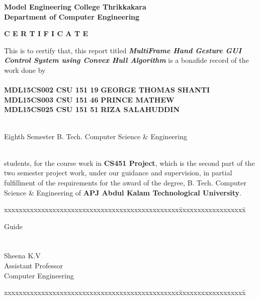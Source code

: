 \documentclass[11pt]{report}
\begin{document}
\begin{titlepage}
\begin{center}
\Large{\textbf{Model Engineering College Thrikkakara}}\\
\Large{\textbf{Department of Computer Engineering}}\\
\end{center}
\begin{figure}[h]
\begin{center}
\end{center}
\end{figure}
\begin{center}
\Large{\textbf{C E R T I F I C A T E}}\\
\vspace{.1in}
\end{center}
This is to certify that, this report titled \textbf{\textit{MultiFrame Hand Gesture GUI Control System using Convex Hull Algorithm}} is a bonafide record of the work done by\\
\\
\Large{\textbf{MDL15CS002 CSU 151 19}}	\hspace{.1in}	\Large{\textbf{GEORGE THOMAS SHANTI}}\\ 
\Large{\textbf{MDL15CS003 CSU 151 46}}	\hspace{.1in}	\Large{\textbf{PRINCE MATHEW}}\\ 
\Large{\textbf{MDL15CS025 CSU 151 51}}	\hspace{.1in}	\Large{\textbf{RIZA SALAHUDDIN}}\\ 
\\
\normalsize
\centerline  {\textsf{Eighth Semester B. Tech. Computer Science \& Engineering}}\\
students,  for the course work in \textbf{CS451 Project}, which is the second part of the two semester project work, under our guidance and supervision, in partial 
 fulfillment of the requirements for the award of the degree, B. Tech. Computer 
Science \& Engineering of \textbf{APJ Abdul Kalam Technological University}.

\footnotesize
\vspace{.1in}
\begin{tabbing}
xxxxxxxxxxxxxxxxxxxxxxxxxxxxxxxxxxxxxxxxxxxxxxx\= xxxxxxxxxxxxxxxxxx\= \kill

Guide		\>				
\\
\\
\\
Sheena K.V \>\>\\
Assistant Professor	\>\>\\
Computer Engineering	\>\>	
\end{tabbing}
\vspace{.1in}
\begin{tabbing}
xxxxxxxxxxxxxxxxxxxxxxxxxxxxxxxxxxxxxxxxxxxxxxx\= xxxxxxxxxxxxxxxxxx\= \kill


\end{tabbing}
\end{titlepage}
\end{document}
